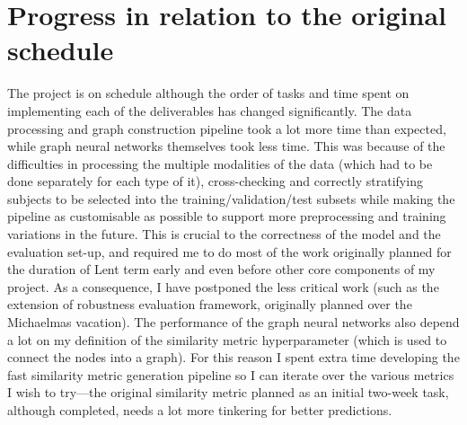 \documentclass[12pt]{article}
\begin{document}
\section*{Progress in relation to the original schedule}
The project is on schedule although the order of tasks and time spent on implementing each of the deliverables has changed significantly. The data processing and graph construction pipeline took a lot more time than expected, while graph neural networks themselves took less time. This was because of the difficulties in processing the multiple modalities of the data (which had to be done separately for each type of it), cross-checking and correctly stratifying subjects to be selected into the training/validation/test subsets while making the pipeline as customisable as possible to support more preprocessing and training variations in the future. This is crucial to the correctness of the model and the evaluation set-up, and required me to do most of the work originally planned for the duration of Lent term early and even before other core components of my project. As a consequence, I have postponed the less critical work (such as the extension of robustness evaluation framework, originally planned over the Michaelmas vacation). The performance of the graph neural networks also depend a lot on my definition of the similarity metric hyperparameter (which is used to connect the nodes into a graph). For this reason I spent extra time developing the fast similarity metric generation pipeline so I can iterate over the various metrics I wish to try—the original similarity metric planned as an initial two-week task, although completed, needs a lot more tinkering for better predictions.
\end{document}
